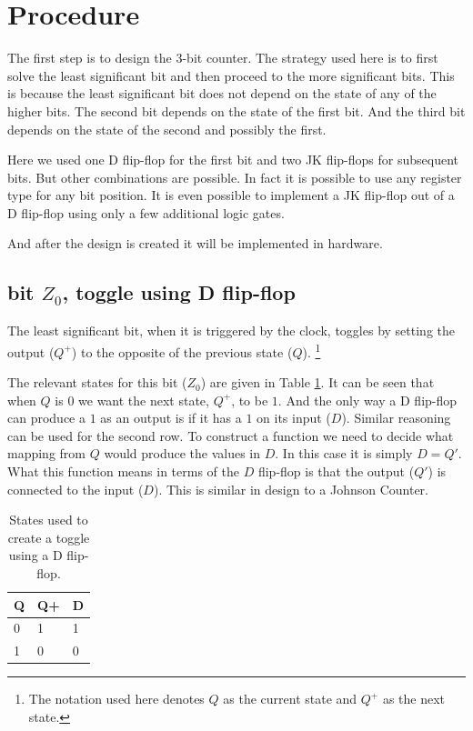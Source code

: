 \documentclass[12pt]{article}
\begin{document}
\section{Procedure}
\label{sec:procedure}

The first step is to design the 3-bit counter.
The strategy used here is to first solve the least significant
bit and then proceed to the more significant bits.
This is because the least significant bit does not depend on the
state of any of the higher bits.
The second bit depends on the state of the first bit.
And the third bit depends on the state of the second and
possibly the first.

Here we used one D flip-flop for the first bit and two JK flip-flops
for subsequent bits.
But other combinations are possible.
In fact it is possible to use any register type for any bit position.
It is even possible to implement a JK flip-flop out of a D flip-flop
using only a few additional logic gates.

And after the design is created it will be implemented in hardware.

\subsection{bit $Z_0$, toggle using D flip-flop}
The least significant bit, when it is triggered by the clock,
toggles by setting the output ($Q^+$) to the opposite of the
previous state ($Q$).
\footnote{The notation used here denotes $Q$ as the current state and $Q^+$ 
as the next state.}

The relevant states for this bit ($Z_0$) are given in Table \ref{tbl:dtoggle}.
It can be seen that when $Q$ is $0$ we want the next state, $Q^+$,
to be $1$.
And the only way a D flip-flop can produce a $1$ as
an output is if it has a $1$ on its input ($D$).
Similar reasoning can be used for the second row.
To construct a function we need to decide what mapping from $Q$
would produce the values in $D$. 
In this case it is simply $D = Q'$.
What this function means in terms of the $D$ flip-flop is that the
output ($Q'$) is connected to the input ($D$).
This is similar in design to a Johnson Counter.

\begin{table}[h!]
\center
\begin{tabular}[t]{l|l|l}
Q & Q+ & D \\
\hline
0 & 1 & 1 \\
1 & 0 & 0
\end{tabular}
\caption{States used to create a toggle using a D flip-flop.}
\label{tbl:dtoggle}
\end{table}
\end{document}
